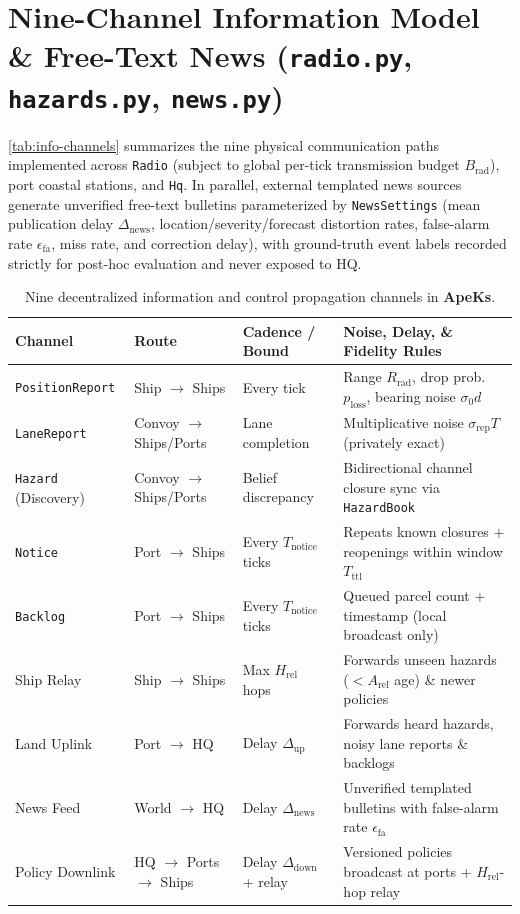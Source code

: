 \documentclass[11pt,a4paper,oneside]{report}
\begin{document}
\section[Nine-Channel Information Model]{Nine-Channel Information Model \& Free-Text News (\texttt{radio.py}, \texttt{hazards.py}, \texttt{news.py})}
\begin{sloppypar}
\autoref{tab:info-channels} summarizes the nine physical communication paths implemented across \texttt{Radio} (subject to global per-tick transmission budget $B_{\text{rad}}$), port coastal stations, and \texttt{Hq}. In parallel, external templated news sources generate unverified free-text bulletins parameterized by \texttt{NewsSettings} (mean publication delay $\Delta_{\text{news}}$, location/severity/forecast distortion rates, false-alarm rate $\epsilon_{\text{fa}}$, miss rate, and correction delay), with ground-truth event labels recorded strictly for post-hoc evaluation and never exposed to HQ.
\end{sloppypar}

\begin{table}[H]
\centering
\caption[Nine decentralized information channels]{Nine decentralized information and control propagation channels in \textbf{ApeKs}.}
\label{tab:info-channels}
\begin{tabularx}{\textwidth}{@{}lll>{\raggedright\arraybackslash}X@{}}
\toprule
\textbf{Channel} & \textbf{Route} & \textbf{Cadence / Bound} & \textbf{Noise, Delay, \& Fidelity Rules} \\
\midrule
\texttt{PositionReport} & Ship $\to$ Ships & Every tick & Range $R_{\text{rad}}$, drop prob.\ $p_{\text{loss}}$, bearing noise $\sigma_0 d$ \\
\texttt{LaneReport} & Convoy $\to$ Ships/Ports & Lane completion & Multiplicative noise $\sigma_{\text{rep}} T$ (privately exact) \\
\texttt{Hazard} (Discovery) & Convoy $\to$ Ships/Ports & Belief discrepancy & Bidirectional channel closure sync via \texttt{HazardBook} \\
\texttt{Notice} & Port $\to$ Ships & Every $T_{\text{notice}}$ ticks & Repeats known closures + reopenings within window $T_{\text{ttl}}$ \\
\texttt{Backlog} & Port $\to$ Ships & Every $T_{\text{notice}}$ ticks & Queued parcel count + timestamp (local broadcast only) \\
Ship Relay & Ship $\to$ Ships & Max $H_{\text{rel}}$ hops & Forwards unseen hazards ($<A_{\text{rel}}$ age) \& newer policies \\
Land Uplink & Port $\to$ HQ & Delay $\Delta_{\text{up}}$ & Forwards heard hazards, noisy lane reports \& backlogs \\
News Feed & World $\to$ HQ & Delay $\Delta_{\text{news}}$ & Unverified templated bulletins with false-alarm rate $\epsilon_{\text{fa}}$ \\
Policy Downlink & HQ $\to$ Ports $\to$ Ships & Delay $\Delta_{\text{down}}$ + relay & Versioned policies broadcast at ports + $H_{\text{rel}}$-hop relay \\
\bottomrule
\end{tabularx}
\end{table}
\end{document}
